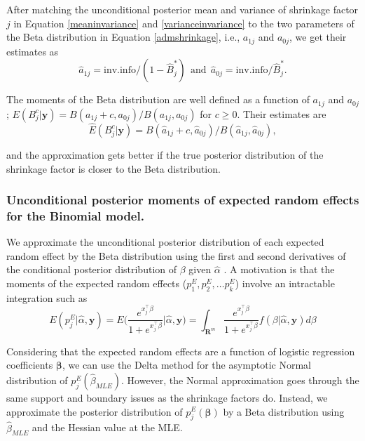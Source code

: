 \documentclass[article]{jss}
\begin{document}
After matching the unconditional posterior mean and variance of shrinkage factor $j$ in Equation \ref{meaninvariance} and \ref{varianceinvariance} to the two parameters of the Beta distribution in Equation \ref{admshrinkage}, i.e., $a_{1j}$ and $a_{0j}$, we get their estimates as
\begin{equation}\label{admpara}
\hat{a}_{1j}=\textrm{inv.info}/(1-\hat{B}^\ast_j)~~\textrm{and}~~\hat{a}_{0j}=\textrm{inv.info}/\hat{B}^\ast_j.
\end{equation}

The moments of the Beta distribution are well defined as a function of $a_{1j}$ and $a_{0j}$; $E(B^c_j\vert\boldsymbol{y})=B(a_{1j} + c, a_{0j})/B(a_{1j}, a_{0j})$ for $c\ge0$. Their estimates are 
\begin{equation}\label{shrinkagemoments}
\widehat{E}(B^c_j\vert\boldsymbol{y})= B(\hat{a}_{1j} + c, \hat{a}_{0j})/B(\hat{a}_{1j}, \hat{a}_{0j}),
\end{equation}

and the approximation gets better if the true posterior distribution of the shrinkage factor is closer to the Beta distribution.




\subsubsection{Unconditional posterior moments of expected random effects for the Binomial model.}
We approximate the unconditional posterior distribution of each expected random effect by the Beta distribution using the first and second derivatives of the conditional posterior distribution of $\beta$ given $\hat{\alpha}$ \citep{carl1988}. A motivation is that the moments of the expected random effects ($p^E_{1}, p^E_{2}, \ldots p^E_{k}$) involve an intractable integration such as
\begin{equation}\label{priormoment1}
E(p^E_{j}\vert\hat{\alpha}, \boldsymbol{y})=E\bigg(\frac{e^{x_j^\top\beta}}{1+e^{x_j^\top\beta}}\bigg\vert\hat{\alpha}, \boldsymbol{y}\bigg)=\int_{\mathbf{R}^{m}} \frac{e^{x_j^\top\beta}}{1+e^{x_j^\top\beta}}f(\beta\vert\hat{\alpha}, \boldsymbol{y})d\beta
\end{equation}

Considering that the expected random effects are a function of logistic regression coefficients $\boldsymbol{\beta}$, we can use the Delta method for the asymptotic Normal distribution of $p^E_{j}(\hat{\beta}_{MLE})$. However, the Normal approximation goes through the same support and boundary issues as the shrinkage factors do. Instead, we approximate the posterior distribution of $p^E_{j}(\boldsymbol{\beta})$ by a Beta distribution using $\hat{\beta}_{MLE}$ and the Hessian value at the MLE.
\end{document}
